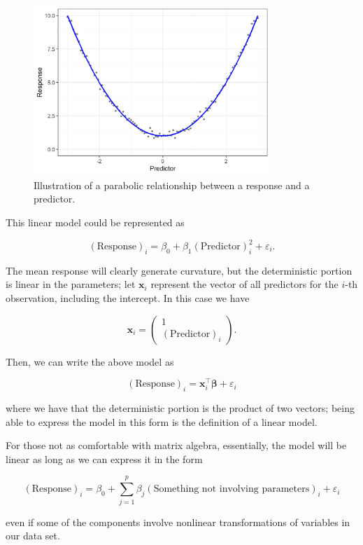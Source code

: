 \documentclass[
]{book}
\theoremstyle{plain}
\theoremstyle{mydefn}
\theoremstyle{myexmpl}
\theoremstyle{remark}
\begin{document}
\begin{figure}

{\centering \includegraphics[width=0.8\textwidth]{./Images/glm-splines-parabola-1} 

}

\caption{Illustration of a parabolic relationship between a response and a predictor.}\label{fig:glm-splines-parabola}
\end{figure}

This linear model could be represented as

\[(\text{Response})_i = \beta_0 + \beta_1 (\text{Predictor})_i^2 + \varepsilon_i.\]

The mean response will clearly generate curvature, but the deterministic portion is linear in the parameters; let \(\mathbf{x}_i\) represent the vector of all predictors for the \(i\)-th observation, including the intercept. In this case we have

\[\mathbf{x}_i = \begin{pmatrix} 1 \\ (\text{Predictor})_i \end{pmatrix}.\]

Then, we can write the above model as

\[(\text{Response})_i = \mathbf{x}_i^\top \boldsymbol{\beta}+ \varepsilon_i\]

where we have that the deterministic portion is the product of two vectors; being able to express the model in this form is the definition of a linear model.

\begin{rmdtip}
For those not as comfortable with matrix algebra, essentially, the model will be linear as long as we can express it in the form

\[(\text{Response})_i = \beta_0 + \sum_{j=1}^{p} \beta_j (\text{Something not involving parameters})_i + \varepsilon_i\]

even if some of the components involve nonlinear transformations of variables in our data set.
\end{rmdtip}
\end{document}
